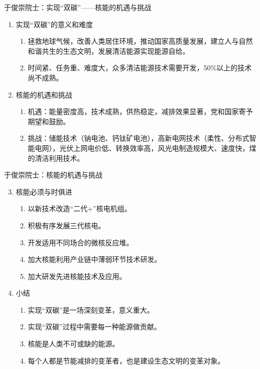 \documentclass{ctexbeamer}
\begin{document}
\begin{frame}{于俊崇院士：实现“双碳”——核能的机遇与挑战}
    \begin{enumerate}
        \item 实现“双碳”的意义和难度
        \begin{enumerate}
            \item 拯救地球气候，改善人类居住环境，推动国家高质量发展，建立人与自然和谐共生的生态文明，发展清洁能源实现能源自给。
            \item 时间紧、任务重、难度大，众多清洁能源技术需要开发，50\%以上的技术尚不成熟。
        \end{enumerate}
        \item 核能的机遇和挑战
        \begin{enumerate}
            \item 机遇：能量密度高，技术成熟，供热稳定，减排效果显著，党和国家寄予期望和鼓励。
            \item 挑战：储能技术（钠电池、钙钛矿电池），高新电网技术（柔性、分布式智能电网），光伏上网电价低、转换效率高，风光电制造规模大、速度快，煤的清洁利用技术。
        \end{enumerate}
    \end{enumerate}
\end{frame}

\begin{frame}{于俊崇院士：核能的机遇与挑战}
    \begin{enumerate}\setcounter{enumi}{2}
        \item 核能必须与时俱进
        \begin{enumerate}
            \item 以新技术改造“二代+”核电机组。
            \item 积极有序发展三代核电。
            \item 开发适用不同场合的微核反应堆。
            \item 加大核能利用产业链中薄弱环节技术研发。
            \item 加大研发先进核能技术及应用。
        \end{enumerate}
        \item 小结
        \begin{enumerate}
            \item 实现“双碳”是一场深刻变革，意义重大。
            \item 实现“双碳”过程中需要每一种能源做贡献。
            \item 核能是人类不可或缺的能源。
            \item 每个人都是节能减排的变革者，也是建设生态文明的变革对象。
        \end{enumerate}
    \end{enumerate}
\end{frame}
\end{document}

